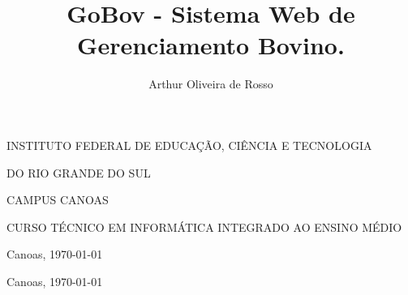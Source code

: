 \documentclass[12pt]{article}
\author{Arthur Oliveira de Rosso}
\title{GoBov - Sistema Web de Gerenciamento Bovino.}
\begin{document}

\makeatletter
\begin{titlepage}
	\begin{center}

		INSTITUTO FEDERAL DE EDUCAÇÃO, CIÊNCIA E TECNOLOGIA 

		DO RIO GRANDE DO SUL

		CAMPUS CANOAS

		CURSO TÉCNICO EM INFORMÁTICA INTEGRADO AO ENSINO MÉDIO

		\vfill
		\vfill

		\@author

		\vfill

		\textbf{\@title}

		\vfill

		\vfill

		Canoas, \today

	\end{center}
\end{titlepage}
\newpage



\makeatletter
\begin{titlepage}
	\begin{center}
		
		\vfill
		\vfill

		\@author

		\vfill

		\textbf{\@title}

		\vfill

		\vfill

		Canoas, \today

	\end{center}
\end{titlepage}
\newpage
\end{document}
